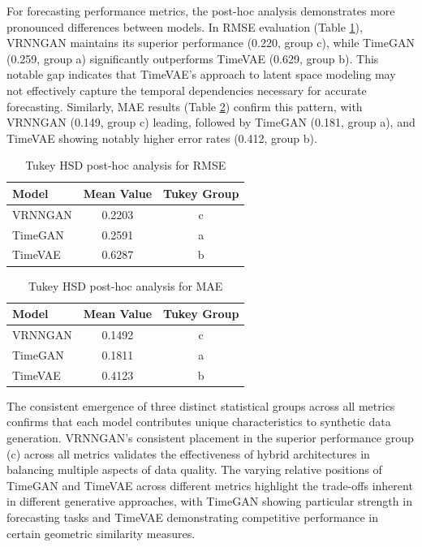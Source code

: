 \documentclass[11pt]{article}
\begin{document}
For forecasting performance metrics, the post-hoc analysis demonstrates more pronounced differences between models. In RMSE evaluation (Table \ref{tab:tukey_rmse}), VRNNGAN maintains its superior performance (0.220, group c), while TimeGAN (0.259, group a) significantly outperforms TimeVAE (0.629, group b). This notable gap indicates that TimeVAE's approach to latent space modeling may not effectively capture the temporal dependencies necessary for accurate forecasting. Similarly, MAE results (Table \ref{tab:tukey_mae}) confirm this pattern, with VRNNGAN (0.149, group c) leading, followed by TimeGAN (0.181, group a), and TimeVAE showing notably higher error rates (0.412, group b).


\begin{table}[H]
\centering
\caption{Tukey HSD post-hoc analysis for RMSE}
\label{tab:tukey_rmse}
\begin{tabular}{lcc}
\toprule
\textbf{Model} & \textbf{Mean Value} & \textbf{Tukey Group} \\
\midrule
VRNNGAN & 0.2203 & c \\
TimeGAN & 0.2591 & a \\
TimeVAE & 0.6287 & b \\
\bottomrule
\end{tabular}
\footnotesize
\end{table}

\begin{table}[H]
\centering
\caption{Tukey HSD post-hoc analysis for MAE}
\label{tab:tukey_mae}
\begin{tabular}{lcc}
\toprule
\textbf{Model} & \textbf{Mean Value} & \textbf{Tukey Group} \\
\midrule
VRNNGAN & 0.1492 & c \\
TimeGAN & 0.1811 & a \\
TimeVAE & 0.4123 & b \\
\bottomrule
\end{tabular}
\footnotesize
\end{table}

The consistent emergence of three distinct statistical groups across all metrics confirms that each model contributes unique characteristics to synthetic data generation. VRNNGAN's consistent placement in the superior performance group (c) across all metrics validates the effectiveness of hybrid architectures in balancing multiple aspects of data quality. The varying relative positions of TimeGAN and TimeVAE across different metrics highlight the trade-offs inherent in different generative approaches, with TimeGAN showing particular strength in forecasting tasks and TimeVAE demonstrating competitive performance in certain geometric similarity measures.
\end{document}

